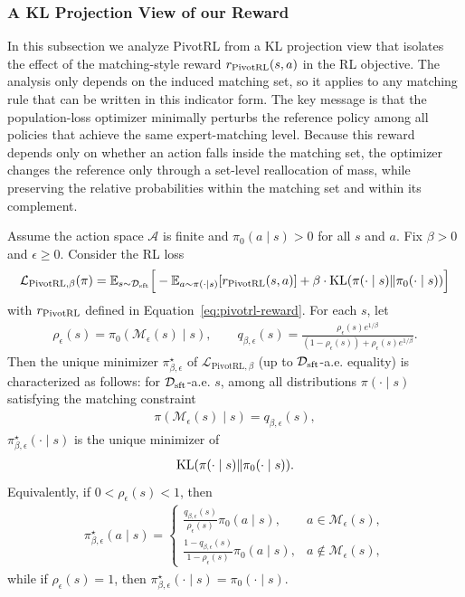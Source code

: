 \subsubsection{A KL Projection View of our Reward}
In this subsection we analyze PivotRL from a KL projection view that isolates the effect of the matching-style reward
$r_{\name}(s,a)$ in the RL objective.
The analysis only depends on the induced matching set, so it applies to any matching rule that can be written in this indicator form.
The key message is that the population-loss optimizer minimally perturbs the reference policy among all policies that achieve the same expert-matching level.
Because this reward depends only on whether an action falls inside the matching set, the optimizer changes the reference only through a set-level reallocation of mass, while preserving the relative probabilities within the matching set and within its complement.

\begin{theorem}\label{thm:pivotrl_kl_projection}
Assume the action space $\mathcal A$ is finite and $\pi_0(a\mid s)>0$ for all $s$ and $a$.
Fix $\beta>0$ and $\epsilon\geq 0$.
Consider the RL loss
\begin{align*}
\mathcal L_{\text{PivotRL},\beta}(\pi)
=
\mathbb E_{s\sim\mathcal D_{\sft}}\Big[
-\mathbb E_{a\sim\pi(\cdot\mid s)}[r_{\name}(s,a)]
+ \beta \cdot \KL(\pi(\cdot\mid s)\|\pi_0(\cdot\mid s))
\Big]
\end{align*}
with $r_{\name}$ defined in Equation~\eqref{eq:pivotrl-reward}.
For each $s$, let
\begin{align*}
\rho_\epsilon(s)=\pi_0(\mathcal M_\epsilon(s)\mid s),
\qquad
q_{\beta,\epsilon}(s)=\frac{\rho_\epsilon(s)e^{1/\beta}}{(1-\rho_\epsilon(s))+\rho_\epsilon(s)e^{1/\beta}}.
\end{align*}
Then the unique minimizer $\pi_{\beta,\epsilon}^\star$ of $\mathcal L_{\text{PivotRL},\beta}$ (up to $\mathcal D_{\mathrm{sft}}$-a.e. equality) is characterized as follows:
for $\mathcal D_{\mathrm{sft}}$-a.e. $s$, among all distributions $\pi(\cdot\mid s)$ satisfying the matching constraint
\begin{align*}
\pi(\mathcal M_\epsilon(s)\mid s)=q_{\beta,\epsilon}(s),
\end{align*}
$\pi_{\beta,\epsilon}^\star(\cdot\mid s)$ is the unique minimizer of
\begin{align*}
\mathrm{KL}(\pi(\cdot\mid s)\|\pi_0(\cdot\mid s)).
\end{align*}
Equivalently, if $0<\rho_\epsilon(s)<1$, then
\begin{align}\label{eq:teacher-policy}
\pi_{\beta,\epsilon}^\star(a\mid s)
=
\begin{cases}
\frac{q_{\beta,\epsilon}(s)}{\rho_\epsilon(s)}\pi_0(a\mid s), & a\in\mathcal M_\epsilon(s),\\[6pt]
\frac{1-q_{\beta,\epsilon}(s)}{1-\rho_\epsilon(s)}\pi_0(a\mid s), & a\notin\mathcal M_\epsilon(s),
\end{cases}
\end{align}
while if $\rho_\epsilon(s)=1$, then $\pi_{\beta,\epsilon}^\star(\cdot\mid s)=\pi_0(\cdot\mid s)$.
\end{theorem}

